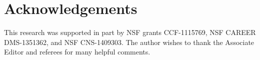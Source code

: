 \documentclass[MSNbibl,number,citesort]{arxbj}
\def\comment{}
\newcommand{\Scal}{\mathcal{S}}
\newcommand{\Ecal}{\mathcal{E}}
\begin{document}
%
%
%

\section*{Acknowledgements}
This research was supported in part by NSF grants CCF-1115769,
NSF CAREER DMS-1351362, and NSF CNS-1409303. The author wishes to
thank the Associate Editor and referees for many helpful comments.

\begin{supplement}
\end{supplement}

\end{document}

